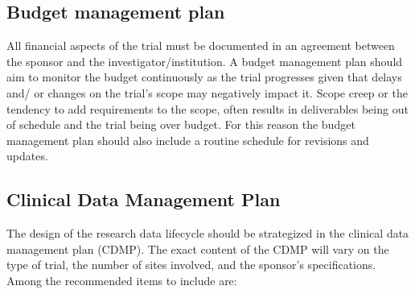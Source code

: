 \documentclass[]{book}
\begin{document}
\subsection{Budget management plan}\label{budget-management-plan}

All financial aspects of the trial must be documented in an agreement
between the sponsor and the investigator/institution. A budget
management plan should aim to monitor the budget continuously as the
trial progresses given that delays and/ or changes on the trial's scope
may negatively impact it. Scope creep or the tendency to add
requirements to the scope, often results in deliverables being out of
schedule and the trial being over budget. For this reason the budget
management plan should also include a routine schedule for revisions and
updates.

\subsection{Clinical Data Management
Plan}\label{clinical-data-management-plan}

The design of the research data lifecycle should be strategized in the
clinical data management plan (CDMP). The exact content of the CDMP will
vary on the type of trial, the number of sites involved, and the
sponsor's specifications. Among the recommended items to include are:
\end{document}
